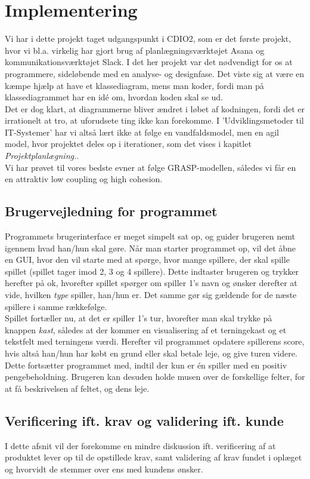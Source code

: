 \chapter{Implementering}
Vi har i dette projekt taget udgangspunkt i CDIO2, som er det første projekt, hvor vi bl.a. virkelig har gjort brug af planlægningsværktøjet Asana og kommunikationsværktøjet Slack.
I det her projekt var det nødvendigt for os at programmere, sideløbende med en analyse- og designfase.
Det viste sig at være en kæmpe hjælp at have et klassediagram, mens man koder, fordi man på klassediagrammet har en idé om, hvordan koden skal se ud.
\\
Det er dog klart, at diagrammerne bliver ændret i løbet af kodningen, fordi det er irrationelt at tro, at uforudsete ting ikke kan forekomme.
I 'Udviklingsmetoder til IT-Systemer' har vi altså lært ikke at følge en vandfaldsmodel, men en agil model, hvor projektet deles op i iterationer, som det vises i kapitlet \textit{Projektplanlægning.}.
\\
Vi har prøvet til vores bedste evner at følge GRASP-modellen, således vi får en en attraktiv low coupling og high cohesion.

\section{Brugervejledning for programmet}
Programmets brugerinterface er meget simpelt sat op, og guider brugeren nemt igennem hvad han/hun skal gøre.
Når man starter programmet op, vil det åbne en GUI, hvor den vil starte med at spørge, hvor mange spillere, der skal spille spillet (spillet tager imod 2, 3 og 4 spillere).
Dette indtaster brugeren og trykker herefter på ok, hvorefter spillet spørger om spiller 1's navn og ønsker derefter at vide, hvilken \textit{type} spiller, han/hun er.
Det samme gør sig gældende for de næste spillere i samme rækkefølge.
\\
Spillet fortæller nu, at det er spiller 1's tur, hvorefter man skal trykke på knappen \textit{kast}, således at der kommer en visualisering af et terningekast og et tekstfelt med terningens værdi.
Herefter vil programmet opdatere spillerens score, hvis altså han/hun har købt en grund eller skal betale leje, og give turen videre.
Dette fortsætter programmet med, indtil der kun er én spiller med en positiv pengebeholdning.
Brugeren kan desuden holde musen over de forskellige felter, for at få beskrivelsen af feltet, og dens leje.

\section{Verificering ift. krav og validering ift. kunde}
I dette afsnit vil der forekomme en mindre diskussion ift. verificering af at produktet lever op til de opstillede krav, samt validering af krav fundet i oplæget og hvorvidt de stemmer over ens med kundens ønsker.\\

